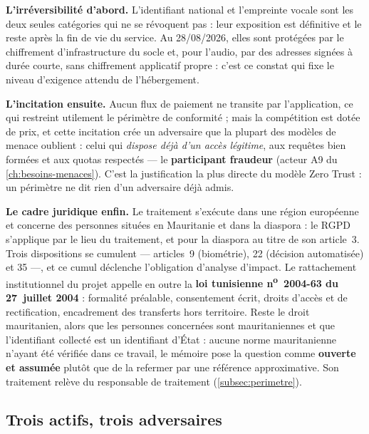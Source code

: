 \textbf{L'irréversibilité d'abord.} L'identifiant national et l'empreinte vocale sont les deux
seules catégories qui ne se révoquent pas : leur exposition est définitive et le reste après la
fin de vie du service. Au 28/08/2026, elles sont protégées par le chiffrement d'infrastructure du
socle et, pour l'audio, par des adresses signées à durée courte, sans chiffrement applicatif
propre : c'est ce constat qui fixe le niveau d'exigence attendu de l'hébergement.

\textbf{L'incitation ensuite.} Aucun flux de paiement ne transite par l'application, ce qui
restreint utilement le périmètre de conformité ; mais la compétition est dotée de prix, et cette
incitation crée un adversaire que la plupart des modèles de menace oublient : celui qui
\emph{dispose déjà d'un accès légitime}, aux requêtes bien formées et aux quotas respectés ---
le \textbf{participant fraudeur} (acteur A9 du \cref{ch:besoins-menaces}). C'est la
justification la plus directe du modèle Zero Trust : un périmètre ne dit rien d'un adversaire
déjà admis.

\textbf{Le cadre juridique enfin.} Le traitement s'exécute dans une région européenne et
concerne des personnes situées en Mauritanie et dans la diaspora : le RGPD s'applique par le lieu
du traitement, et pour la diaspora au titre de son article~3. Trois dispositions se cumulent ---
articles~9 (biométrie), 22 (décision automatisée) et 35 ---, et ce cumul déclenche l'obligation
d'analyse d'impact. Le rattachement institutionnel du projet appelle en outre la \textbf{loi
tunisienne n\textsuperscript{o}~2004-63 du 27~juillet 2004} : formalité préalable, consentement
écrit, droits d'accès et de rectification, encadrement des transferts hors territoire. Reste le
droit mauritanien, alors que les personnes concernées sont mauritaniennes et que l'identifiant
collecté est un identifiant d'État : aucune norme mauritanienne n'ayant été vérifiée dans ce
travail, le mémoire pose la question comme \textbf{ouverte et assumée} plutôt que de la refermer
par une référence approximative. Son traitement relève du responsable de traitement
(\cref{subsec:perimetre}).

\subsection{Trois actifs, trois adversaires}
\label{subsec:actifs-adversaires}

